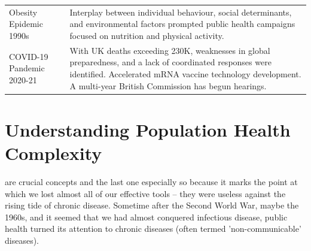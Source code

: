 \begin{table}[h]
\begin{tabular}{@{}p{}p{}@{}}
		\\
		Obesity Epidemic 1990s & Interplay between individual behaviour, social determinants, and environmental factors prompted public health campaigns focused on nutrition and physical activity.
		\\
		COVID-19 Pandemic 2020-21 & With UK deaths exceeding 230K, weaknesses in global preparedness, and a lack of coordinated responses were identified. Accelerated mRNA vaccine technology development. A multi-year British Commission has begun hearings.
		\\
		\bottomrule
	\end{tabular}
\end{table}



\chapter{Understanding Population Health Complexity}


 are crucial concepts and the last one especially so because it marks the point at which we lost almost all of our effective tools -- they were useless against the rising tide of chronic disease. Sometime after the Second World War, maybe the 1960s, and it seemed that we had almost conquered infectious disease, public health turned its attention to chronic diseases (often termed 'non-communicable' diseases).

